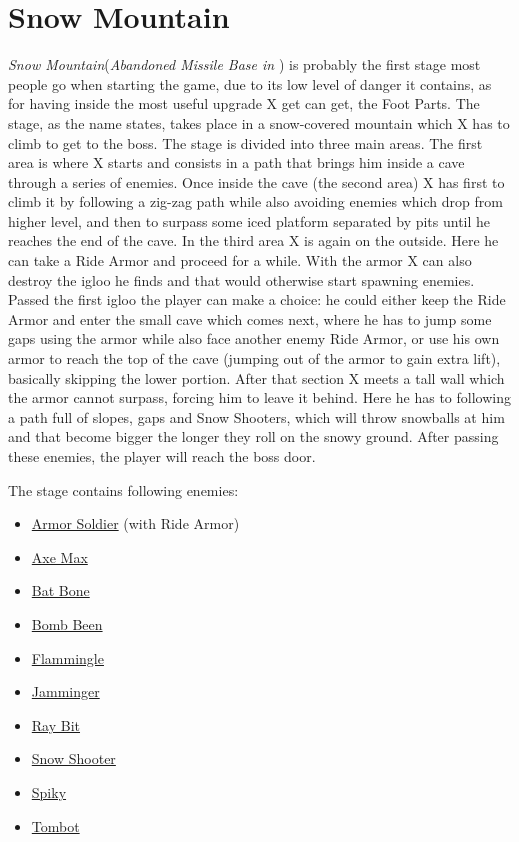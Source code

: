 \section{Snow Mountain}
\textit{Snow Mountain}(\textit{Abandoned Missile Base in \mhx}) is probably the first stage most people go when starting the game, due to its low level of danger it contains\cite{stratwiki:Snow_mountain}, as for having inside the most useful upgrade X get can get, the Foot Parts. The stage, as the name states, takes place in a snow-covered mountain which X has to climb to get to the boss. The stage is divided into three main areas. The first area is where X starts and consists in a path that brings him inside a cave through a series of enemies. Once inside the cave (the second area) X has first to climb it by following a zig-zag path while also avoiding enemies which drop from higher level, and then to surpass some iced platform separated by pits until he reaches the end of the cave. In the third area X is again on the outside. Here he can take a Ride Armor and proceed for a while. With the armor X can also destroy the igloo he finds and that would otherwise start spawning enemies. Passed the first igloo the player can make a choice: he could either keep the Ride Armor and enter the small cave which comes next, where he has to jump some gaps using the armor while also face another enemy Ride Armor, or use his own armor to reach the top of the cave (jumping out of the armor to gain extra lift), basically skipping the lower portion. After that section X meets a tall wall which the armor cannot surpass, forcing him to leave it behind. Here he has to following a path full of slopes, gaps and Snow Shooters, which will throw snowballs at him and that become bigger the longer they roll on the snowy ground. After passing these enemies, the player will reach the boss door.

The stage contains following enemies\cite{wiki:Snow_mountain}:
\begin{itemize}
	\item \hyperlink{enem:Armor_Soldier}{Armor Soldier} (with Ride Armor)
	\item \hyperlink{enem:Axe_Max}{Axe Max}
	\item \hyperlink{enem:Bat_Bone}{Bat Bone}
	\item \hyperlink{enem:Bomb_Been}{Bomb Been}
	\item \hyperlink{enem:Flammingle}{Flammingle}
	\item \hyperlink{enem:Jamminger}{Jamminger }
	\item \hyperlink{enem:Ray_Bit}{Ray Bit}
	\item \hyperlink{enem:Snow_Shooter}{Snow Shooter}
	\item \hyperlink{enem:Spiky}{Spiky}
	\item \hyperlink{enem:Tombot}{Tombot}
\end{itemize}
